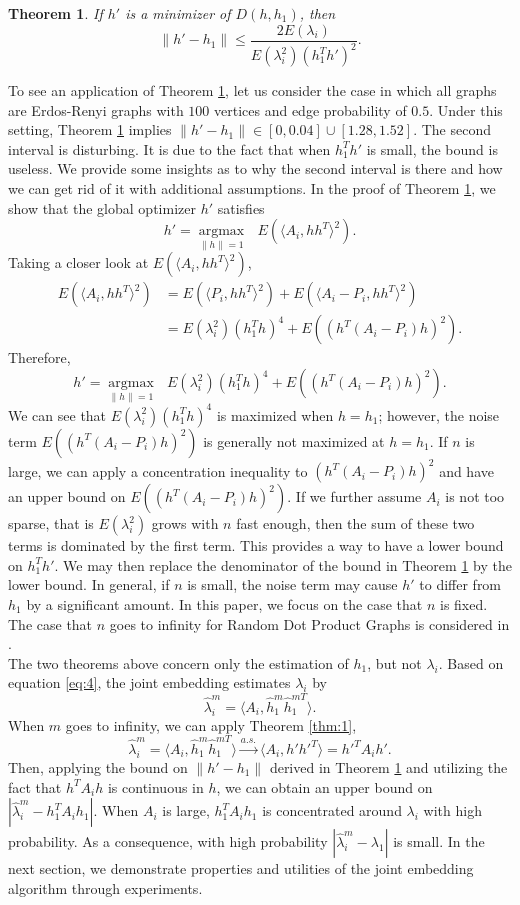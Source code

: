 \documentclass[10pt,journal,compsoc]{IEEEtran}
\newtheorem{theorem}{Theorem}[section]
\begin{document}
\begin{theorem}
\label{thm:2}
If $h'$ is a minimizer of $D(h,h_1)$, then 
\[\|h'-h_1\| \leq \frac{2 E(\lambda_i)}{E(\lambda_i^2)(h_1^T h')^2}. \]
\end{theorem}

\noindent	To see an application of Theorem \ref{thm:2}, let us consider the case in which all graphs are Erdos-Renyi graphs with $100$ vertices and edge probability of $0.5$. Under this setting, Theorem \ref{thm:2} implies  $\|h'-h_1\| \in [0,0.04] \cup [1.28,1.52]$. The second interval is disturbing. It is due to the fact that when $h_1^T h'$ is small, the bound is useless. We provide some insights as to why the second interval is there and how we can get rid of it with additional assumptions. In the proof of Theorem \ref{thm:2}, we show that the global optimizer $h'$ satisfies
\[h'= \underset{\|h\| =1}{\operatorname{argmax}} \text{ } E(\langle A_i,h h^T \rangle ^2). \]
Taking a closer look at $E(\langle A_i,h h^T \rangle ^2)$,
\begin{align*}
	E(\langle A_i,h h^T \rangle ^2) &= E(\langle P_i,h h^T \rangle ^2)+E(\langle A_i-P_i,h h^T \rangle ^2) \\
	&=E(\lambda_i^2)(h_1^T h)^4+E((h^T (A_i-P_i)h) ^2).
\end{align*}
Therefore, 
\[h'= \underset{\|h\| =1}{\operatorname{argmax}} \text{ } E(\lambda_i^2)(h_1^T h)^4+E((h^T (A_i-P_i)h) ^2) .\]
We can see that $E(\lambda_i^2)(h_1^T h)^4$ is maximized when $h=h_1$; however, the noise term $E((h^T (A_i-P_i)h) ^2)$ is generally not maximized at $h=h_1$. If $n$ is large, we can apply a concentration inequality to $(h^T (A_i-P_i)h) ^2$ and have an upper bound on $E((h^T (A_i-P_i)h) ^2)$. If we further assume $A_i$ is not too sparse, that is $E(\lambda_i^2)$ grows with $n$ fast enough, then the sum of these two terms is dominated by the first term. This provides a way to have a lower bound on $h_1^T h'$. We may then replace the denominator of the bound in Theorem \ref{thm:2} by the lower bound. In general, if $n$ is small, the noise term may cause $h'$ to differ from $h_1$ by a significant amount. In this paper, we focus on the case that $n$ is fixed. The case that $n$ goes to infinity for Random Dot Product Graphs is considered in \cite{athreya2013limit}.\\


\noindent The two theorems above concern only the estimation of $h_1$, but not $\lambda_i$. Based on equation \eqref{eq:4}, the joint embedding estimates $\lambda_i$ by
\[\hat{\lambda}_i^m= \langle A_i,\hat{h}_1^m \hat{h}_1^{m T} \rangle. \]
When $m$ goes to infinity, we can apply Theorem \ref{thm:1},
\[\hat{\lambda}_i^m = \langle A_i,\hat{h}_1^m \hat{h}_1^{mT} \rangle \overset{a.s.}{\rightarrow} \langle A_i,h' h'^T \rangle = h'^T A_i h'.\]
Then, applying the bound on $\|h'-h_1\|$ derived in Theorem \ref{thm:2} and utilizing the fact that $h^T A_i h$ is continuous in $h$, we can obtain an upper bound on $|\hat{\lambda}_i^m - h_1^T A_i h_1|$. When $A_i$ is large, $h_1^T A_i h_1$ is concentrated around $\lambda_i$ with high probability. As a consequence, with high probability $|\hat{\lambda}_i^m - \lambda_1|$ is small. In the next section, we demonstrate properties and utilities of the joint embedding algorithm through experiments. 
\end{document}
